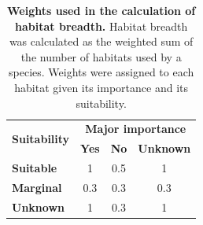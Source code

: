 \documentclass[11pt]{article}
\begin{document}
\begin{table}[h!]
\renewcommand{\baselinestretch}{1}
\renewcommand{\arraystretch}{1.5}
\begin{center}\fontsize{9}{11}\selectfont
\caption[Weights used in the calculation of habitat breadth]{\textbf{Weights used in the calculation of habitat breadth.} Habitat breadth was calculated as the weighted sum of the number of habitats used by a species. Weights were assigned to each habitat given its importance and its suitability.} 
\label{weights}
\begin{tabular}{|l|c|c|c|}
\hline
\multicolumn{1}{|c|}{\multirow{2}{*}{\textbf{Suitability}}} & \multicolumn{3}{c|}{\textbf{Major importance}} \\ \cline{2-4} 
\multicolumn{1}{|c|}{}                             & \textbf{Yes}       & \textbf{No}        & \textbf{Unknown}       \\ \hline
\textbf{Suitable}                                           & 1         & 0.5       & 1             \\ \hline
\textbf{Marginal}                                           & 0.3       & 0.3       & 0.3           \\ \hline
\textbf{Unknown}                                            & 1         & 0.3       & 1             \\ \hline
\end{tabular}
\end{center}
\end{table}
\end{document}
